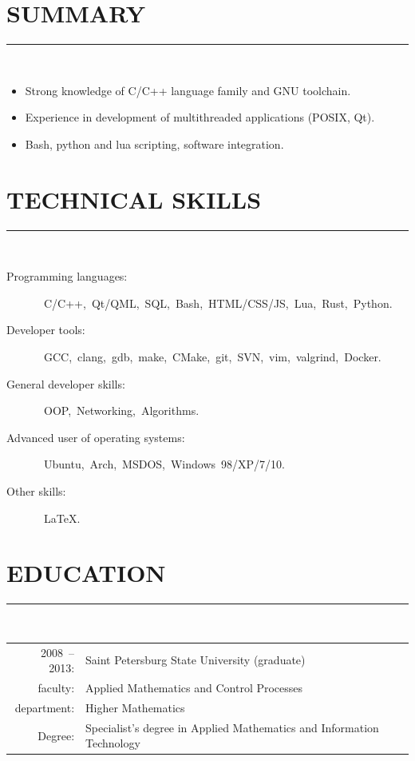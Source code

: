 \documentclass[a4paper,oneside,12pt]{article}
\newcommand{\cvpart}[1]{%
\vspace{-0.9em}%
\section*{\Large\bfseries\MakeTextUppercase{#1}}%
\vspace{-1.7em}%
\rule{\linewidth}{0.3em}\\[-0.8em]%
}
\begin{document}
\cvpart{Summary}
\begin{itemize}
\item Strong knowledge of C/C++ language family and GNU toolchain.
\item Experience in development of multithreaded applications (POSIX, Qt).
\item Bash, python and lua scripting, software integration.
\end{itemize}


\cvpart{Technical skills}
\begin{description}
\item[Programming languages:]~C/C++,~Qt/QML,~SQL,~Bash,~HTML/CSS/JS,~Lua,~Rust,~Python.
\item[Developer tools:]~GCC,~clang,~gdb,~make,~CMake,~git,~SVN,~vim,~valgrind,~Docker.
\item[General developer skills:]~OOP,~Networking,~Algorithms.
\item[Advanced user of operating systems:]~Ubuntu,~Arch,~MSDOS,~Windows~98/XP/7/10.
\item[Other skills:]~LaTeX.
\end{description}


\cvpart{Education}

\begin{tabularx}{\linewidth}{rX}
      2008~-- 2013:& Saint Petersburg State University (graduate)\\
           faculty:& Applied Mathematics and Control Processes\\
        department:& Higher Mathematics\\
            Degree:& Specialist's degree in Applied Mathematics and Information Technology
\end{tabularx}
\end{document}

